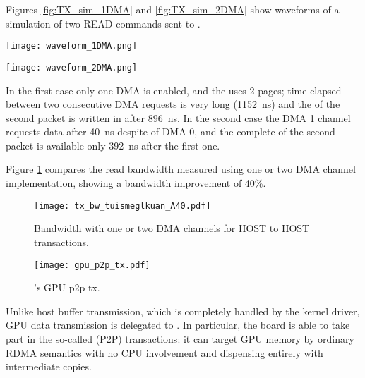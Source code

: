Figures \ref{fig:TX_sim_1DMA} and \ref{fig:TX_sim_2DMA} show waveforms
of a simulation of two READ commands sent to \apenetp.
\begin{sidewaysfigure}
  \centering
  \texttt{[image: waveform\_1DMA.png]}
  \caption{\apenetp's CPU TX simulation with 1 DMA channel.
Time elapsed between two consecutive DMA requests is very long
(1152~ns) and the \payload of the second packet is written in  after 896~ns.}
  \label{fig:TX_sim_1DMA}
\end{sidewaysfigure}

\begin{sidewaysfigure}
  \centering
  \texttt{[image: waveform\_2DMA.png]}
  \caption{\apenetp's CPU TX simulation with 2 DMA channels.
The second request occurrs only 40~ns after the first one, 
and the complete \payload of the second packet is available 
only 392~ns after the first packet \payload.}
  \label{fig:TX_sim_2DMA}
\end{sidewaysfigure}

In the first case only one DMA is enabled, and the  uses 2
pages; time elapsed between two consecutive DMA requests is very long
(1152~ns) and the \payload of the second packet is written in  after 896~ns. In the second case the DMA 1 channel
requests data after 40~ns despite of DMA 0, and the complete \payload
of the second packet is available only 392~ns after the first one.

Figure \ref{fig:2DMA_BW} compares the read bandwidth measured using
one or two DMA channel implementation, showing a bandwidth improvement
of 40\%.

 \begin{figure}[!hbt]
  \centering
  \texttt{[image: tx\_bw\_tuismeglkuan\_A40.pdf]}
  \caption{Bandwidth with one or two DMA channels for HOST to HOST
  transactions.}
  \label{fig:2DMA_BW}
\end{figure}



 \begin{figure}[!htb]
  \centering
  \texttt{[image: gpu\_p2p\_tx.pdf]}
  \caption{\apenetp's GPU p2p tx.}
  \label{fig:tx_gpu}
  
\end{figure}
Unlike host buffer transmission, which is completely handled by the
kernel driver, GPU data transmission is delegated to \apenetp.  In
particular, the \apenetp board is able to take part in the so-called
\PCIe \PtoP (P2P) transactions: it can target GPU memory by ordinary
RDMA semantics with no CPU involvement and dispensing entirely with
intermediate copies.

